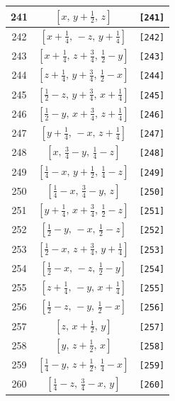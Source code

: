 \documentclass[fleqn,8pt]{jsarticle}
\begin{document}
\begin{longtable}{ccc}
241 & $\left[ x,\, y + \frac{1}{2},\, z \right]$ & {\tt [241]} \\ \hline
242 & $\left[ x + \frac{1}{4},\, - z,\, y + \frac{1}{4} \right]$ & {\tt [242]} \\ \hline
243 & $\left[ x + \frac{1}{4},\, z + \frac{3}{4},\, \frac{1}{2} - y \right]$ & {\tt [243]} \\ \hline
244 & $\left[ z + \frac{1}{4},\, y + \frac{3}{4},\, \frac{1}{2} - x \right]$ & {\tt [244]} \\ \hline
245 & $\left[ \frac{1}{2} - z,\, y + \frac{3}{4},\, x + \frac{1}{4} \right]$ & {\tt [245]} \\ \hline
246 & $\left[ \frac{1}{2} - y,\, x + \frac{3}{4},\, z + \frac{1}{4} \right]$ & {\tt [246]} \\ \hline
247 & $\left[ y + \frac{1}{4},\, - x,\, z + \frac{1}{4} \right]$ & {\tt [247]} \\ \hline
248 & $\left[ x,\, \frac{3}{4} - y,\, \frac{1}{4} - z \right]$ & {\tt [248]} \\ \hline
249 & $\left[ \frac{1}{4} - x,\, y + \frac{1}{2},\, \frac{1}{4} - z \right]$ & {\tt [249]} \\ \hline
250 & $\left[ \frac{1}{4} - x,\, \frac{3}{4} - y,\, z \right]$ & {\tt [250]} \\ \hline
251 & $\left[ y + \frac{1}{4},\, x + \frac{3}{4},\, \frac{1}{2} - z \right]$ & {\tt [251]} \\ \hline
252 & $\left[ \frac{1}{2} - y,\, - x,\, \frac{1}{2} - z \right]$ & {\tt [252]} \\ \hline
253 & $\left[ \frac{1}{2} - x,\, z + \frac{3}{4},\, y + \frac{1}{4} \right]$ & {\tt [253]} \\ \hline
254 & $\left[ \frac{1}{2} - x,\, - z,\, \frac{1}{2} - y \right]$ & {\tt [254]} \\ \hline
255 & $\left[ z + \frac{1}{4},\, - y,\, x + \frac{1}{4} \right]$ & {\tt [255]} \\ \hline
256 & $\left[ \frac{1}{2} - z,\, - y,\, \frac{1}{2} - x \right]$ & {\tt [256]} \\ \hline
257 & $\left[ z,\, x + \frac{1}{2},\, y \right]$ & {\tt [257]} \\ \hline
258 & $\left[ y,\, z + \frac{1}{2},\, x \right]$ & {\tt [258]} \\ \hline
259 & $\left[ \frac{1}{4} - y,\, z + \frac{1}{2},\, \frac{1}{4} - x \right]$ & {\tt [259]} \\ \hline
260 & $\left[ \frac{1}{4} - z,\, \frac{3}{4} - x,\, y \right]$ & {\tt [260]} \\ \hline

\end{longtable}
\end{document}
